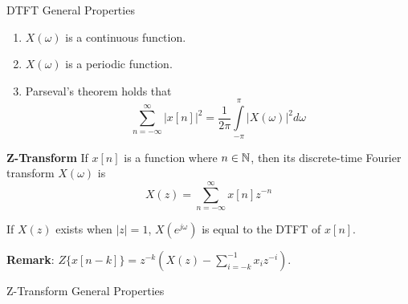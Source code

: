 DTFT General Properties

\begin{enumerate}
    \item $X(\omega)$ is a continuous function.
    \item $X(\omega)$ is a periodic function.
    \item Parseval's theorem holds that
     \begin{equation}
        \sum\limits_{n =  - \infty }^\infty  {{{\left| {x[n]} \right|}^2}}  = \frac{1}{{2\pi }}\int\limits_{ - \pi }^\pi  {{{\left| {X(\omega )} \right|}^2}d\omega } 
    \end{equation}
\end{enumerate}

\begin{defn}{\textbf{{Z-Transform}}}
If $x[n]$ is a function where $n \in \mathbb{N}$, then its discrete-time Fourier transform $X(\omega)$ is 
\begin{equation}
    X(z) = \sum\limits_{n = -\infty}^\infty {x[n] z^{-n}}
\end{equation}
\end{defn}    

If $X(z)$ exists when $|z| = 1$, $X(e^{j \omega})$ is equal to the DTFT of $x[n]$. 

\textbf{Remark}: $Z\{ x[n - k] \} = z^{-k}(X(z) - \sum\limits_{i=-k}^{-1} x_i z^{-i}) $.

Z-Transform General Properties

